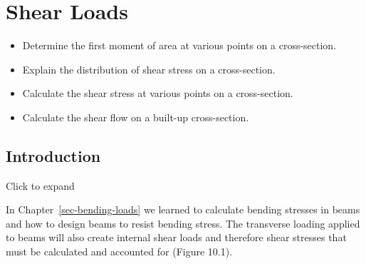 \documentclass[
  letterpaper,
  DIV=11,
  numbers=noendperiod]{scrreprt}
\providecommand{\tightlist}{%
  \setlength{\itemsep}{0pt}\setlength{\parskip}{0pt}}\usepackage{longtable,booktabs,array}
\theoremstyle{definition}
\theoremstyle{remark}
\begin{document}

\chapter{Shear Loads}\label{sec-shear-loads}

\begin{tcolorbox}[enhanced jigsaw, leftrule=.75mm, colbacktitle=quarto-callout-note-color!10!white, breakable, opacityback=0, colback=white, titlerule=0mm, toprule=.15mm, colframe=quarto-callout-note-color-frame, coltitle=black, title={Learning Objectives}, toptitle=1mm, bottomrule=.15mm, rightrule=.15mm, left=2mm, arc=.35mm, opacitybacktitle=0.6, bottomtitle=1mm]

\begin{itemize}
\tightlist
\item
  Determine the first moment of area at various points on a
  cross-section.
\item
  Explain the distribution of shear stress on a cross-section.
\item
  Calculate the shear stress at various points on a cross-section.
\item
  Calculate the shear flow on a built-up cross-section.
\end{itemize}

\end{tcolorbox}

\section*{Introduction}\label{introduction-9}


Click to expand

In Chapter~\ref{sec-bending-loads} we learned to calculate bending
stresses in beams and how to design beams to resist bending stress. The
transverse loading applied to beams will also create internal shear
loads and therefore shear stresses that must be calculated and accounted
for (Figure 10.1).
\end{document}
